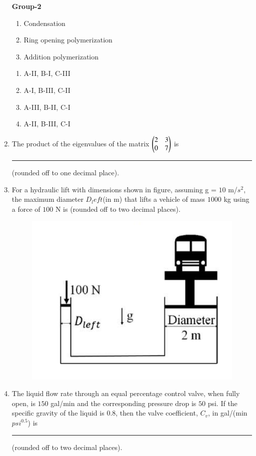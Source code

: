 \documentclass[journal,12pt,onecolumn]{IEEEtran}
\theoremstyle{remark}
\begin{document}
\begin{enumerate}
\begin{multicols}{2}
    \textbf{Group-2}
    \begin{enumerate}[label=(\Roman*)]
        \item Condensation
        \item Ring opening polymerization
        \item Addition polymerization
    \end{enumerate}
\end{multicols}
\begin{multicols}{2}
    \begin{enumerate}
        \item A-II, B-I, C-III
        \item A-I, B-III, C-II
        \item A-III, B-II, C-I
        \item A-II, B-III, C-I
    \end{enumerate}
\end{multicols}

    \item 
        The product of the eigenvalues of the matrix  $\begin{pmatrix}
            2 & 3 \\
            0 & 7
        \end{pmatrix}$ is \rule{2cm}{0.1mm} (rounded off to one decimal place).
        
  \hfill{}    

    \item For a hydraulic lift with dimensions shown in figure, assuming g = $10$ m/$s^2$, the maximum diameter $D_left$(in m) that lifts a vehicle of mass $1000$ kg using a force of $100$ N is (rounded off to two decimal places).
    
 \hfill{}
    \begin{figure}[H]
        \centering
        \includegraphics[width=0.4\columnwidth]{Fig/23.png}
        \caption*{}
        \label{fig: 23}
    \end{figure}

\item The liquid flow rate through an equal percentage control valve, when fully open, is $150$ gal/min and the corresponding pressure drop is $50$ psi. If the specific gravity of the liquid is $0.8$, then the valve coefficient, $C_v$, in gal/(min $psi^{0.5}$) is  \rule{1cm}{0.1mm} (rounded off to two decimal places).


\end{enumerate}
\end{document}
